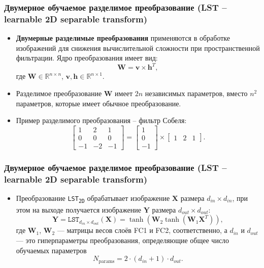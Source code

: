 \begin{frame}
\frametitle{Двумерное обучаемое разделимое преобразование (LST – learnable 2D separable transform)}

\begin{itemize}
    \item \textbf{Двумерные разделимые преобразования} применяются в обработке изображений для снижения вычислительной сложности при пространственной фильтрации. Ядро преобразования имеет вид:
  \[
  \mathbf{W} = \mathbf{v} \times \mathbf{h}^{T},
  \]
  где $\mathbf{W} \in \mathbb{R}^{n \times n}$, $\mathbf{v}, \mathbf{h} \in \mathbb{R}^{n \times 1}$.
  
    \item Разделимое преобразование $\mathbf{W}$ имеет $2n$ независимых параметров, вместо $n^2$ параметров, которые имеет обычное преобразование.
    
    \item Пример разделимого преобразования – фильтр Собеля:
  \[
  \begin{bmatrix}
  1 & 2 & 1 \\
  0 & 0 & 0 \\
  -1 & -2 & -1
  \end{bmatrix}
  =
  \begin{bmatrix}
  1 \\
  0 \\
  -1
  \end{bmatrix}
  \times
  \begin{bmatrix}
  1 & 2 & 1
  \end{bmatrix}.
  \]
  \end{itemize}
\end{frame}
\begin{frame}[t]
    \frametitle{Двумерное обучаемое разделимое преобразование (LST – learnable 2D separable transform)}
    \begin{itemize}
        
        \item Преобразование \texttt{LST\textsubscript{2D}} обрабатывает изображение $\mathbf{X}$ размера $d_{in} \times d_{in}$, при этом на выходе получается изображение $\mathbf{Y}$ размера $d_{out} \times d_{out}$:
      \[
      \mathbf{Y} = \texttt{LST}_{d_{in} \times d_{out}}(\mathbf{X}) = \tanh(\mathbf{W}_2 \tanh(\mathbf{W}_1 \mathbf{X}^{T})),
      \]
      где $\mathbf{W}_1$, $\mathbf{W}_2$ — матрицы весов слоёв FC1 и FC2, соответственно, а $d_{in}$ и $d_{out}$ — это гиперпараметры преобразования, определяющие общее число обучаемых параметров
      \[
      N_{\text{params}} = 2 \cdot (d_{in} + 1) \cdot d_{out}.
      \]
      
    \end{itemize}
    
\end{frame}
